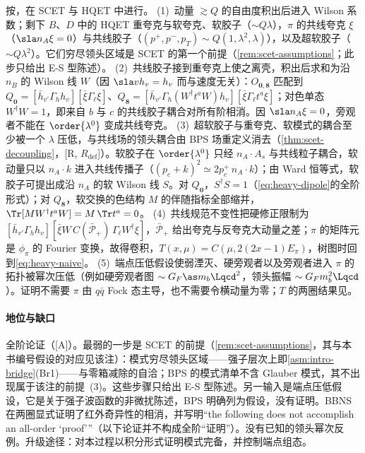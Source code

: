 \begin{proofsketch}
按\cite{BauerPirjolStewart2001}，在 SCET 与 HQET 中进行。
(1)~动量 $\gtrsim Q$ 的自由度积出后进入 Wilson 系数；剩下 $B$、$D$ 中的 HQET 重夸克与软夸克、软胶子（$\sim Q\lambda$），$\pi$ 的共线夸克 $\xi$（$\sla n_A\xi=0$）与共线胶子（$(p^+,p^-,p_T)\sim Q(1,\lambda^2,\lambda)$），以及超软胶子（$\sim Q\lambda^2$）。它们穷尽领头区域是 SCET 的第一个前提（\cref{rem:scet-assumptions}；此步只给出 E-S 型陈述）。
(2)~共线胶子接到重夸克上使之离壳，积出后求和为沿 $n_B$ 的 Wilson 线 $W$（因 $\sla vh_v=h_v$ 而与速度无关）：$O_{\mathbf 0,\mathbf 8}$ 匹配到 $Q_{\mathbf 0}=[\bar h_{v'}\Gamma_hh_v][\bar\xi\Gamma_\ell\xi]$、$Q_{\mathbf 8}=[\bar h_{v'}\Gamma_h(W^\dagger t^aW)h_v][\bar\xi\Gamma_\ell t^a\xi]$；对色单态 $W^\dagger W=1$，即来自 $b$ 与 $c$ 的共线胶子耦合对所有阶相消。因 $\sla n_A\xi=0$，旁观者不能在 $\order{\lambda^0}$ 变成共线夸克。
(3)~超软胶子与重夸克、软模式的耦合至少被一个 $\lambda$ 压低，与共线场的领头耦合由 BPS 场重定义消去（\cref{thm:scet-decoupling}，[R, $R_{\mathrm{def}}$]）。软胶子在 $\order{\lambda^0}$ 只经 $n_A\cdot A_s$ 与共线粒子耦合，软动量只以 $n_A\cdot k$ 进入共线传播子（$(p_c+k)^2\simeq2p_c^+\,n_A\cdot k$）；由 Ward 恒等式，软胶子可提出成沿 $n_A$ 的软 Wilson 线 $S$。对 $Q_{\mathbf 0}$，$S^\dagger S=1$（\cref{eq:heavy-dipole}的全阶形式）；对 $Q_{\mathbf 8}$，软交换的色结构 $M$ 的伴随指标全部缩并，$\Tr[MW^\dagger t^aW]=M\,\Tr t^a=0$\cite[式~(7)]{BauerPirjolStewart2001}。
(4)~共线规范不变性把硬修正限制为 $[\bar h_{v'}\Gamma_hh_v][\bar\xi W\,C(\bar{\mathcal P}_+)\,\Gamma_\ell W^\dagger\xi]$，$\bar{\mathcal P}_+$ 给出夸克与反夸克大动量之差；$\pi$ 的矩阵元是 $\phi_\pi$ 的 Fourier 变换，故得卷积，$T(x,\mu)=C(\mu,2(2x-1)E_\pi)$，树图时回到\cref{eq:heavy-naive}。
(5)~端点压低假设使弱湮灭、硬旁观者以及旁观者进入 $\pi$ 的拓扑被幂次压低（例如硬旁观者图 $\sim G_F\as m_b\Lqcd^2$，领头振幅 $\sim G_Fm_b^2\Lqcd$\cite[式~(26)、(28)]{BenekeEtAl2000}）。证明不需要 $\pi$ 由 $q\bar q$ Fock 态主导，也不需要令横动量为零\cite{BauerPirjolStewart2001}；$T$ 的两圈结果见\cite{Huber:2016xod}。
\end{proofsketch}

\paragraph{地位与缺口}
全阶论证（[A]）。最弱的一步是 SCET 的前提（\cref{rem:scet-assumptions}，其与本书编号假设的对应见该注）：模式穷尽领头区域——强子层次上即\cref{asm:intro-bridge}(Br1)——与零箱减除的自洽；BPS 的模式清单不含 Glauber 模式，其不出现属于该注的前提~(3)。这些步骤只给出 E-S 型陈述。另一输入是端点压低假设，它是关于强子波函数的非微扰陈述，BPS 明确列为假设，没有证明。BBNS 在两圈显式证明了红外奇异性的相消，并写明“the following does not accomplish an all-order ‘proof’”（以下论证并不构成全阶“证明”）\cite[第~5~节]{BenekeEtAl2000}。没有已知的领头幂次反例。升级途径：对本过程以积分形式证明模式完备，并控制端点组态。

